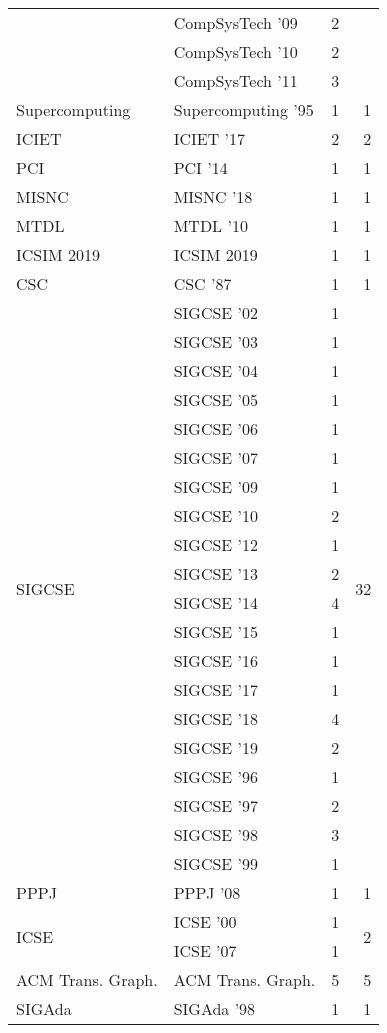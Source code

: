 \begin{table*}[t]
\begin{tabular}{llrr}
& CompSysTech '09 & 2 &\\
& CompSysTech '10 & 2 &\\
& CompSysTech '11 & 3 &\\
\multirow{1}{*}{Supercomputing } & Supercomputing '95 & 1 & \multirow{1}{*}{1}\\
\multirow{1}{*}{ICIET } & ICIET '17 & 2 & \multirow{1}{*}{2}\\
\multirow{1}{*}{PCI } & PCI '14 & 1 & \multirow{1}{*}{1}\\
\multirow{1}{*}{MISNC } & MISNC '18 & 1 & \multirow{1}{*}{1}\\
\multirow{1}{*}{MTDL } & MTDL '10 & 1 & \multirow{1}{*}{1}\\
\multirow{1}{*}{ICSIM 2019} & ICSIM 2019 & 1 & \multirow{1}{*}{1}\\
\multirow{1}{*}{CSC } & CSC '87 & 1 & \multirow{1}{*}{1}\\
\multirow{20}{*}{SIGCSE } & SIGCSE '02 & 1 & \multirow{20}{*}{32}\\
& SIGCSE '03 & 1 &\\
& SIGCSE '04 & 1 &\\
& SIGCSE '05 & 1 &\\
& SIGCSE '06 & 1 &\\
& SIGCSE '07 & 1 &\\
& SIGCSE '09 & 1 &\\
& SIGCSE '10 & 2 &\\
& SIGCSE '12 & 1 &\\
& SIGCSE '13 & 2 &\\
& SIGCSE '14 & 4 &\\
& SIGCSE '15 & 1 &\\
& SIGCSE '16 & 1 &\\
& SIGCSE '17 & 1 &\\
& SIGCSE '18 & 4 &\\
& SIGCSE '19 & 2 &\\
& SIGCSE '96 & 1 &\\
& SIGCSE '97 & 2 &\\
& SIGCSE '98 & 3 &\\
& SIGCSE '99 & 1 &\\
\multirow{1}{*}{PPPJ } & PPPJ '08 & 1 & \multirow{1}{*}{1}\\
\multirow{2}{*}{ICSE } & ICSE '00 & 1 & \multirow{2}{*}{2}\\
& ICSE '07 & 1 &\\
\multirow{1}{*}{ACM Trans. Graph.} & ACM Trans. Graph. & 5 & \multirow{1}{*}{5}\\
\multirow{1}{*}{SIGAda } & SIGAda '98 & 1 & \multirow{1}{*}{1}\\

\end{tabular}
\end{table*}
